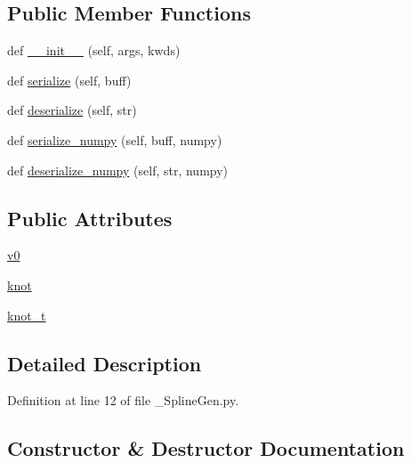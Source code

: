 \subsection*{Public Member Functions}
\begin{DoxyCompactItemize}
\item 
def \hyperlink{classtraj__gen_1_1srv_1_1___spline_gen_1_1_spline_gen_request_ac0fd3e808fc39ea9d123b378ded80575}{\+\_\+\+\_\+init\+\_\+\+\_\+} (self, args, kwds)
\item 
def \hyperlink{classtraj__gen_1_1srv_1_1___spline_gen_1_1_spline_gen_request_aa40917f0c85f6cfdbcd2d273a01e5bdb}{serialize} (self, buff)
\item 
def \hyperlink{classtraj__gen_1_1srv_1_1___spline_gen_1_1_spline_gen_request_ae1dfd7769392e418f7ad42c4f7f9708c}{deserialize} (self, str)
\item 
def \hyperlink{classtraj__gen_1_1srv_1_1___spline_gen_1_1_spline_gen_request_a42c8864818e66d49554bfc40400d2602}{serialize\+\_\+numpy} (self, buff, numpy)
\item 
def \hyperlink{classtraj__gen_1_1srv_1_1___spline_gen_1_1_spline_gen_request_a43206a642274d69f8b80390d6c7fedb2}{deserialize\+\_\+numpy} (self, str, numpy)
\end{DoxyCompactItemize}
\subsection*{Public Attributes}
\begin{DoxyCompactItemize}
\item 
\hyperlink{classtraj__gen_1_1srv_1_1___spline_gen_1_1_spline_gen_request_a77afe0e6b8ae07bb8b9dd4171fb74b66}{v0}
\item 
\hyperlink{classtraj__gen_1_1srv_1_1___spline_gen_1_1_spline_gen_request_a2b37c37e4533074522acea65456a3561}{knot}
\item 
\hyperlink{classtraj__gen_1_1srv_1_1___spline_gen_1_1_spline_gen_request_a1436c238c429826b3035af44d2d67f77}{knot\+\_\+t}
\end{DoxyCompactItemize}


\subsection{Detailed Description}


Definition at line 12 of file \+\_\+\+Spline\+Gen.\+py.



\subsection{Constructor \& Destructor Documentation}
